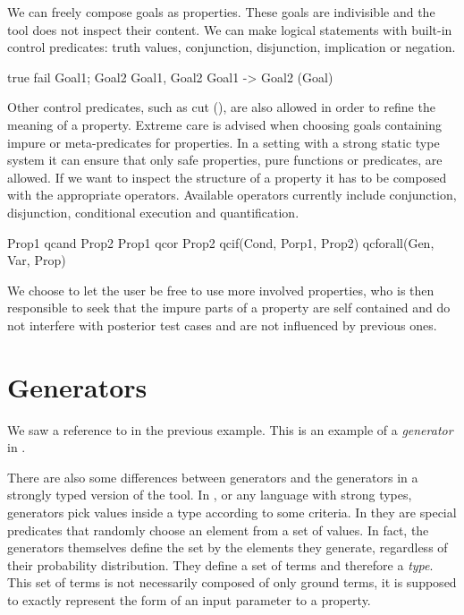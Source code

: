 We can freely compose \Prolog{} goals as properties.
%
These goals are indivisible and the tool does not inspect their content.
%
We can make logical statements with built-in control predicates:
truth values, conjunction, disjunction, implication or negation.
%
\begin{yapcode}
   true
   fail
   Goal1; Goal2
   Goal1, Goal2
   Goal1 -> Goal2
   \+(Goal)
\end{yapcode}
%
Other control predicates, such as cut (\yap{!}), are also allowed in
order to refine the meaning of a property.
%
Extreme care is advised when choosing goals containing impure or
meta-predicates for properties.
%
In a setting with a strong static type system it can ensure that only
safe properties, pure functions or predicates, are allowed.
%
If we want \plqc{} to inspect the structure of a property it has to be
composed with the appropriate operators.
%
Available operators currently include conjunction, disjunction,
conditional execution and quantification.
%
\begin{yapcode}
   Prop1 qcand Prop2
   Prop1 qcor Prop2
   qcif(Cond, Porp1, Prop2)
   qcforall(Gen, Var, Prop)
\end{yapcode}
%
We choose to let the user be free to use more involved properties, who
is then responsible to seek that the impure parts of a property are self
contained and do not interfere with posterior test cases and are not
influenced by previous ones.


\section{Generators}
\label{sec:generators}

We saw a reference to  in the previous example.
%
This is an example of a \emph{generator} in \plqc{}.



There are also some differences between \plqc{} generators and the
generators in a strongly typed version of the tool.
%
In \Haskell{} \QuickCheck{}, or any language with strong types,
generators pick values inside a type according to some criteria.
%
In \plqc{} they are special predicates that randomly choose an element
from a set of values.
%
In fact, the generators themselves define the set by the elements
they generate, regardless of their probability distribution.
%
They define a set of terms and therefore a \emph{type}.
%
This set of terms is not necessarily composed of only ground terms, it
is supposed to exactly represent the form of an input parameter to a
property.


